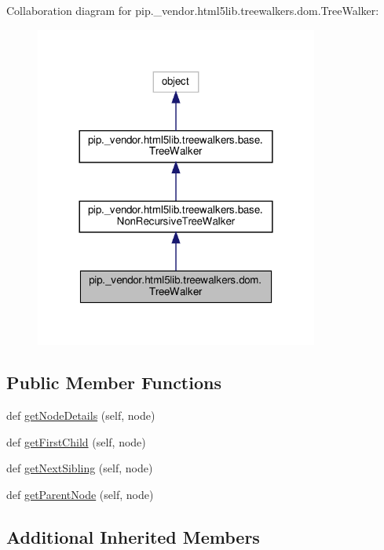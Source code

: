 Collaboration diagram for pip.\+\_\+vendor.\+html5lib.\+treewalkers.\+dom.\+Tree\+Walker\+:
\nopagebreak
\begin{figure}[H]
\begin{center}
\leavevmode
\includegraphics[width=264pt]{classpip_1_1__vendor_1_1html5lib_1_1treewalkers_1_1dom_1_1TreeWalker__coll__graph}
\end{center}
\end{figure}
\subsection*{Public Member Functions}
\begin{DoxyCompactItemize}
\item 
def \hyperlink{classpip_1_1__vendor_1_1html5lib_1_1treewalkers_1_1dom_1_1TreeWalker_ac93669ea2857fafe04059e1248a619f0}{get\+Node\+Details} (self, node)
\item 
def \hyperlink{classpip_1_1__vendor_1_1html5lib_1_1treewalkers_1_1dom_1_1TreeWalker_a27274d97d7e9e90c7167772a3f180407}{get\+First\+Child} (self, node)
\item 
def \hyperlink{classpip_1_1__vendor_1_1html5lib_1_1treewalkers_1_1dom_1_1TreeWalker_ab55bd8f01805c0869bd00cddb817e71f}{get\+Next\+Sibling} (self, node)
\item 
def \hyperlink{classpip_1_1__vendor_1_1html5lib_1_1treewalkers_1_1dom_1_1TreeWalker_a2e2f9d91f5ba21d685137014f8125569}{get\+Parent\+Node} (self, node)
\end{DoxyCompactItemize}
\subsection*{Additional Inherited Members}


